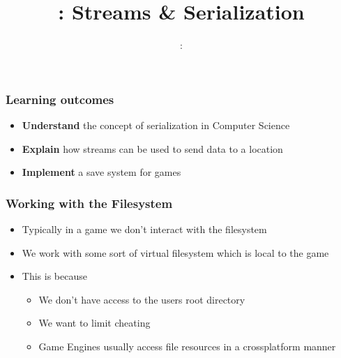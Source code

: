 \usepackage{../../beamerthemeFalmouthGamesAcademy}
\usepackage{multimedia}
\graphicspath{ {../../} }


\usepackage[normalem]{ulem}
\usepackage{wasysym}
\usepackage{listings}
\usepackage{pdfpages}
\usepackage{enumerate}

\usetikzlibrary{arrows,automata}




\title{\sessionnumber: Streams \& Serialization}
\subtitle{\modulecode: \moduletitle}

\frame{\titlepage}

\begin{frame}
	\frametitle{Learning outcomes}
	\begin{itemize}
		\item \textbf{Understand} the concept of serialization in Computer Science
		\item \textbf{Explain} how streams can be used to send data to a location
		\item \textbf{Implement} a save system for games
	\end{itemize}
\end{frame}

\begin{frame}
	\frametitle{Working with the Filesystem}
	\begin{itemize}
		\item Typically in a game we don't interact with the filesystem
		\item We work with some sort of virtual filesystem which is local to the game
		\item This is because
		\begin{itemize}
				\item We don't have access to the users root directory
				\item We want to limit cheating
				\item Game Engines usually access file resources in a crossplatform manner
		\end{itemize}
	\end{itemize}
\end{frame}

